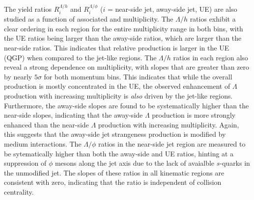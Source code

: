 The yield ratios $R_{i}^{\Lambda/h}$ and $R_{i}^{\Lambda/\phi}$ ($i$ = near-side jet, away-side jet, UE) are also studied as a function of associated \pt and multiplicity. The $\Lambda/h$ ratios exhibit a clear ordering in each region for the entire multiplicity range in both \pt bins, with the UE ratios being larger than the away-side ratios, which are larger than the near-side ratios. This indicates that relative \lmb production is larger in the UE (QGP) when compared to the jet-like regions. The $\Lambda/h$ ratios in each region also reveal a strong dependence on multiplicity, with slopes that are greater than zero by nearly $5\sigma$ for both momentum bins. This indicates that while the overall \lmb production is mostly concentrated in the UE, the observed enhancement of $\Lambda$ production with increasing multiplicity is \textit{also} driven by the jet-like regions. Furthermore, the away-side slopes are found to be systematically higher than the near-side slopes, indicating that the away-side $\Lambda$ production is more strongly enhanced than the near-side $\Lambda$ production with increasing multiplicity. Again, this suggests that the away-side jet strangeness production is modified by medium interactions. The $\Lambda/\phi$ ratios in the near-side jet region are measured to be sytematically higher than both the away-side and UE ratios, hinting at a suppression of $\phi$ mesons along the jet axis due to the lack of avaialble $s$-quarks in the unmodified jet. The slopes of these ratios in all kinematic regions are consistent with zero, indicating that the ratio is independent of collision centrality.


